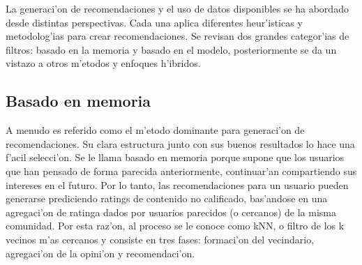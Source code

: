 \documentclass[11pt]{article}
\begin{document}
La generaci'on de recomendaciones y el uso de datos disponibles se ha abordado desde distintas perspectivas. Cada una aplica diferentes heur'isticas y metodolog'ias para crear recomendaciones. Se revisan dos grandes categor'ias de filtros: basado en la memoria y basado en el modelo, posteriormente se da un vistazo a otros m'etodos y enfoques h'ibridos.


\subsection{Basado en memoria}
A menudo es referido como el m'etodo dominante para generaci'on de recomendaciones. Su clara estructura junto con sus buenos resultados lo hace una f'acil selecci'on. Se le llama basado en memoria porque supone que los usuarios que han pensado de forma parecida anteriormente, continuar'an compartiendo sus intereses en el futuro. Por lo tanto, las recomendaciones para un usuario pueden generarse prediciendo ratings de contenido no calificado, bas'andose en una agregaci'on de ratinga dados por usuarios parecidos (o cercanos) de la misma comunidad. Por esta raz'on, al proceso se le conoce como kNN, o filtro de los k vecinos m'as cercanos y consiste en tres fases: formaci'on del vecindario, agregaci'on de la opini'on y recomendaci'on.
\end{document}
